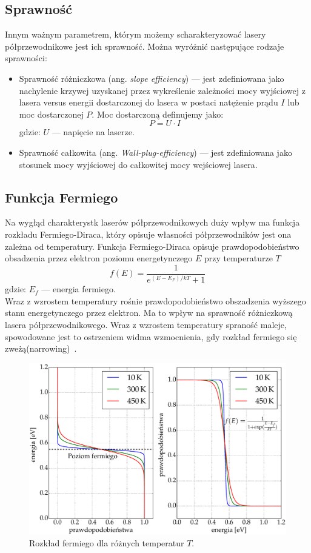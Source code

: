 \subsection{Sprawność}
Innym ważnym parametrem, którym możemy scharakteryzować lasery półprzewodnikowe jest ich sprawność. Można wyróżnić następujące rodzaje sprawności:
\begin{itemize}
\item Sprawność różniczkowa (ang. \textit{slope efficiency}) --- jest zdefiniowana jako nachylenie krzywej uzyskanej przez wykreślenie zależności
mocy wyjściowej z lasera versus energii dostarczonej do lasera w postaci natężenie prądu $I$ lub moc dostarczonej $P$.
Moc dostarczoną definujemy jako:
\begin{equation}
P = U \cdot I
\end{equation}
gdzie: $U$ --- napięcie na laserze.
\item Sprawność całkowita (ang. \textit{Wall-plug-efficiency}) --- jest zdefiniowana jako stosunek mocy wyjściowej do całkowitej mocy wejściowej lasera.
\end{itemize}
\subsection{Funkcja Fermiego}
Na wygłąd charakterystk laserów półprzewodnikowych duży wpływ ma funkcja rozkładu Fermiego-Diraca, który opisuje
własności półprzewodników jest ona zależna od temperatury. Funkcja Fermiego-Diraca opisuje prawdopodobieństwo obsadzenia przez elektron poziomu
energetynczego $E$ przy temperaturze $T$
\begin{equation}
f(E) = \frac{1}{e^{(E-E_F)/kT} + 1}
\end{equation}
gdzie: $E_f$ --- energia fermiego. \\
Wraz z wzrostem temperatury rośnie prawdopodobieństwo obszadzenia wyższego stanu energetynczego przez elektron. Ma to
wpływ na sprawność różniczkową lasera półprzewodnikowego. Wraz z wzrostem temperatury spraność maleje, spowodowane jest to ostrzeniem
widma wzmocnienia, gdy rozkład fermiego się zweżą(narrowing)~\cite{publikacja_1}.
\begin{figure}
\center
  \includegraphics[scale=0.30]{fermi.eps}
  \caption{Rozkład fermiego dla różnych temperatur $T$.}
  \label{teoria_rys_1}
\end{figure}
\newpage
